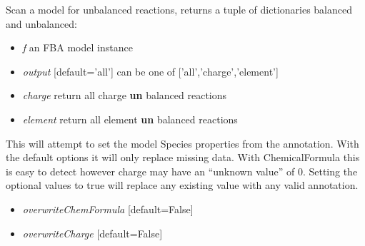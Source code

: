 \documentclass[a4paper,11pt,english]{sphinxmanual}
\begin{document}

\begin{fulllineitems}
\label{modules_doc:cbmpy.CBTools.scanForUnbalancedReactions}
Scan a model for unbalanced reactions, returns a tuple of dictionaries balanced and unbalanced:
\begin{itemize}
\item {} 
\emph{f} an FBA model instance

\item {} 
\emph{output} {[}default='all'{]} can be one of {[}'all','charge','element'{]}

\item {} 
\emph{charge} return all charge \textbf{un} balanced reactions

\item {} 
\emph{element} return all element \textbf{un} balanced reactions

\end{itemize}

\end{fulllineitems}


\begin{fulllineitems}
\label{modules_doc:cbmpy.CBTools.setSpeciesPropertiesFromAnnotations}
This will attempt to set the model Species properties from the annotation. With the default options
it will only replace missing data. With ChemicalFormula this is easy to detect however charge may
have an ``unknown value'' of 0. Setting the optional values to true will replace any existing value
with any valid annotation.
\begin{itemize}
\item {} 
\emph{overwriteChemFormula} {[}default=False{]}

\item {} 
\emph{overwriteCharge} {[}default=False{]}

\end{itemize}

\end{fulllineitems}

\end{document}
